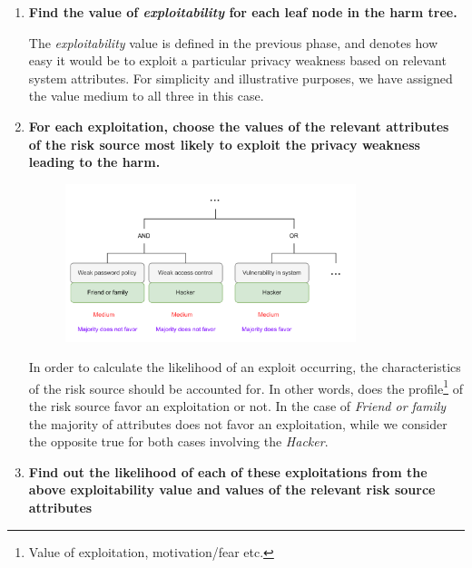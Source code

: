 \begin{enumerate}
  \item{\textbf{Find the value of \textit{exploitability} for each leaf node in the harm tree.}}

       The \textit{exploitability} value is defined in the previous phase, and
       denotes how easy it would be to exploit a particular privacy weakness based on
       relevant system attributes. For simplicity and illustrative purposes,
       we have assigned the value medium to all three in this case.

  \item{\textbf{For each exploitation, choose the values of the relevant attributes of
        the risk source most likely to exploit the privacy weakness leading to the
        harm.}}

        \begin{figure}[hbt!]
          \centering
          \includegraphics[width=0.8\textwidth]{pictures/step2.png}
          \caption{}{}
          \label{fig:favor}
        \end{figure}

        In order to calculate the likelihood of an exploit occurring, the
        characteristics of the risk source should be accounted for. In other words, does
        the profile\footnote{Value of exploitation, motivation/fear etc.} of the risk
        source favor an exploitation or not. In the case of \textit{Friend or family}
        the majority of attributes does not favor an exploitation, while we
        consider the opposite true for both cases involving the \textit{Hacker}.

  \item{\textbf{Find out the likelihood of each of these exploitations from the above
        exploitability value and values of the relevant risk source attributes}}


\end{enumerate}
